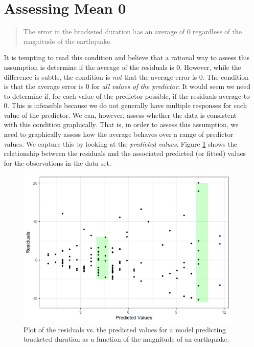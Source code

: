 \documentclass[
]{book}
\theoremstyle{plain}
\theoremstyle{mydefn}
\theoremstyle{myexmpl}
\theoremstyle{remark}
\begin{document}
\hypertarget{assessing-mean-0}{%
\section{Assessing Mean 0}\label{assessing-mean-0}}

\begin{quote}
The error in the bracketed duration has an average of 0 regardless of the magnitude of the earthquake.
\end{quote}

It is tempting to read this condition and believe that a rational way to assess this assumption is determine if the average of the residuals is 0. However, while the difference is subtle, the condition is \emph{not} that the average error is 0. The condition is that the average error is 0 for \emph{all values of the predictor}. It would seem we need to determine if, for each value of the predictor possible, if the residuals average to 0. This is infeasible because we do not generally have multiple responses for each value of the predictor. We can, however, assess whether the data is consistent with this condition graphically. That is, in order to assess this assumption, we need to graphically assess how the average behaves over a range of predictor values. We capture this by looking at the \emph{predicted values}. Figure \ref{fig:regassessment-mean0} shows the relationship between the residuals and the associated predicted (or fitted) values for the observations in the data set.

\begin{figure}

{\centering \includegraphics[width=0.8\linewidth]{./Images/regassessment-mean0-1} 

}

\caption{Plot of the residuals vs. the predicted values for a model predicting bracketed duration as a function of the magnitude of an earthquake.}\label{fig:regassessment-mean0}
\end{figure}
\end{document}
